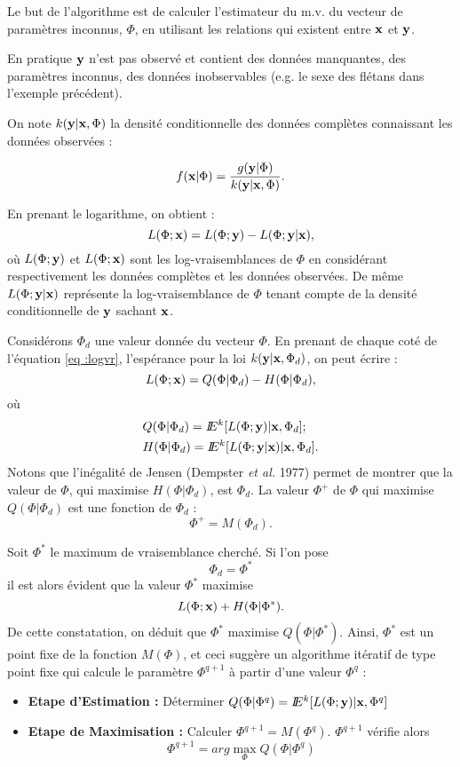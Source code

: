 Le but de l'algorithme est de calculer l'estimateur du m.v. du vecteur
de param\`etres inconnus, $\Phi$, en utilisant les relations qui existent
entre $\mbox{\bf x}$ et $\mbox{\bf y}$. 

En pratique $\mbox{\bf y}$ n'est pas observ\'e et contient des donn\'ees manquantes,
des param\`etres inconnus, des donn\'ees inobservables (e.g. le sexe des
fl\'etans dans l'exemple pr\'ec\'edent).

On note $k(\mbox{\bf y} |  \mbox{\bf x}, \Phi)$ la densit\'e conditionnelle des donn\'ees
compl\`etes connaissant les donn\'ees observ\'ees :

\begin{equation}
f(\mbox{\bf x} | \Phi) =  \frac{g(\mbox{\bf y} | \Phi)}{k(\mbox{\bf y} |  \mbox{\bf x}, \Phi)}.
\end{equation} 

En prenant le logarithme, on obtient :
\begin{equation}
\label{eq :logvr}
 L(\Phi;\mbox{\bf x}) = L(\Phi;\mbox{\bf y}) - L(\Phi;\mbox{\bf y}|\mbox{\bf x}),
\end{equation}
o\`u $L(\Phi;\mbox{\bf y})$ et $L(\Phi;\mbox{\bf x})$ sont les log-vraisemblances de $\Phi$
en consid\'erant respectivement les donn\'ees compl\`etes et les donn\'ees
observ\'ees. De m\^eme $L(\Phi;\mbox{\bf y}|\mbox{\bf x})$ repr\'esente la log-vraisemblance 
de $\Phi$ tenant compte de la densit\'e conditionnelle de $\mbox{\bf y}$ sachant $\mbox{\bf x}$.

Consid\'erons $\Phi_d$ une valeur donn\'ee du
vecteur $\Phi$. En prenant de chaque cot\'e de l'\'equation
\ref{eq :logvr}, l'esp\'erance pour la loi $k(\mbox{\bf y} |  \mbox{\bf x}, \Phi_d)$,
on peut \'ecrire :
\begin{equation}
\label{eq :em}
L(\Phi;\mbox{\bf x}) =Q(\Phi | \Phi_d) - H(\Phi | \Phi_d),
\end{equation}
o\`u 
\begin{eqnarray*}
& Q(\Phi | \Phi_d)=I\!\!E^k [L(\Phi;\mbox{\bf y}) | \mbox{\bf x}, \Phi_d ]; \\
& H(\Phi | \Phi_d)=I\!\!E^k [L(\Phi;\mbox{\bf y} | \mbox{\bf x}) | \mbox{\bf x}, \Phi_d ].
\end{eqnarray*}
Notons que l'in\'egalit\'e de Jensen (Dempster {\em et al.} 1977) permet de montrer que la valeur de $\Phi$, qui maximise $H(\Phi | \Phi_d)$, est $\Phi_d$. La valeur $\Phi^+$ de $\Phi$ qui maximise $Q(\Phi | \Phi_d)$ 
est une fonction de $\Phi_d$ :
\begin{equation}
\label{eq :fixe}
\Phi^+ = M( \Phi_d).
\end{equation}

Soit $\Phi^*$ le maximum de vraisemblance cherch\'e. Si l'on pose
$$
\Phi_d=\Phi^*
$$
il est alors \'evident que la valeur $\Phi^*$ maximise
$$
L(\Phi;\mbox{\bf x}) + H(\Phi | \Phi^*).
$$
De cette constatation, on d\'eduit que $\Phi^*$ maximise $Q(\Phi | \Phi^*)$.
Ainsi, $\Phi^*$ est un point fixe de la fonction $M(\Phi)$, et ceci
sugg\`ere un algorithme it\'eratif 
de type point fixe qui calcule le param\`etre $\Phi^{q+1}$ \`a partir 
d'une valeur  $\Phi^{q}$ :
\begin{itemize}
\item {\bf Etape d'Estimation :} D\'eterminer $Q(\Phi | \Phi^q)=I\!\!E^k [L(\Phi;\mbox{\bf y}) | \mbox{\bf x}, \Phi^q ]$
\item {\bf Etape de Maximisation :}  Calculer $\Phi^{q+1} = M( \Phi^q)$. $\Phi^{q+1}$
 v\'erifie alors 
$$
\Phi^{q+1}=arg \max_{\Phi}Q(\Phi | \Phi^q)
$$ 
\end{itemize}

